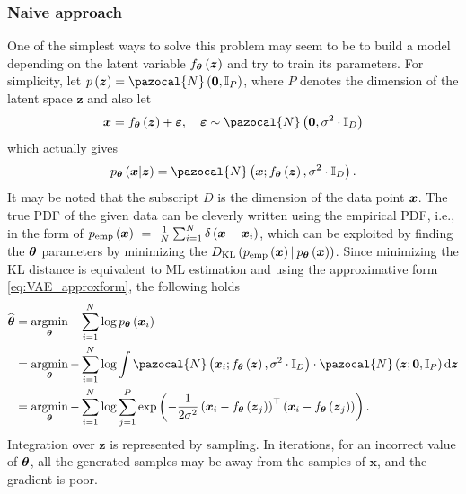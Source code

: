 \subsubsection{Naive approach}
One of the simplest ways to solve this problem may seem to be to build a model depending on the latent variable $f_{\boldsymbol{\theta}}\left(\boldsymbol{z}\right)$ and try to train its parameters. For simplicity, let $p\left(\boldsymbol{z} \right) = \pazocal{N}\left(\boldsymbol{0}, \mathbb{I}_P\right)$, where $P$ denotes the dimension of the latent space $\boldsymbol{z}$ and also let
\begin{equation}
\bx = f_{\bt}\left(\boldsymbol{z}\right) + \boldsymbol{\varepsilon}, \quad \boldsymbol{\varepsilon} \sim \pazocal{N}\left(\boldsymbol{0},\sigma^2\cdot\mathbb{I}_D \right)
\end{equation}
which actually gives 
\begin{equation}\label{eq:VAE_decoder}
p_{\bt}\left(\bx\vert\boldsymbol{z}\right) = \pazocal{N}\left(\boldsymbol{x};f_{\bt}\left(\boldsymbol{z}\right),\sigma^2\cdot\mathbb{I}_D \right).
\end{equation}
It may be noted that the subscript $D$ is the dimension of the data point $\boldsymbol{x}$. The true PDF of the given data can be cleverly written using the empirical PDF, i.e., in the form of $p_{\mathrm{emp}}\left(\boldsymbol{x} \right)~=~\frac{1}{N}\sum_{i=1}^N\delta\left(\boldsymbol{x} - \boldsymbol{x}_i\right) $,
which can be exploited by finding the $\boldsymbol{\theta}$ parameters by minimizing the $D_{\mathrm{KL}} \left(p_{\mathrm{emp}}\left(\boldsymbol{x} \right) \Vert p_{\boldsymbol{\theta}}\left(\boldsymbol{x}\right) \right)$. Since minimizing the KL distance is equivalent to ML estimation and using the approximative form \eqref{eq:VAE_approxform}, the following holds 
\begin{align}
    \widehat{\boldsymbol{\bt}} &= \argmin_{\boldsymbol{\bt}}- \sum_{i=1}^N\log p_{\boldsymbol{\bt}}\left(\boldsymbol{x}_i \right)\\
    &=  \argmin_{\boldsymbol{\bt}}- \sum_{i=1}^N \log \int \pazocal{N}\left(\boldsymbol{x}_i;f_{\bt}\left(\boldsymbol{z}\right),\sigma^2\cdot\mathbb{I}_D \right) \cdot \pazocal{N}\left(\boldsymbol{z};\boldsymbol{0}, \mathbb{I}_P\right) \d{\boldsymbol{z}}\\
    &= \argmin_{\boldsymbol{\bt}}- \sum_{i=1}^N \log \sum_{j=1}^{P}\exp\left(-\frac{1}{2\sigma^2}\left(\bx_i-f_{\bt}\left(\boldsymbol{z}_j\right)\right)^\top\left(\bx_i-f_{\bt}\left(\boldsymbol{z}_j\right)\right) \right).
\end{align}
Integration over $\boldsymbol{z}$ is represented by sampling. In iterations, for an incorrect value of $\boldsymbol{\theta}$, all the generated samples may
be away from the samples of $\boldsymbol{x}$, and the gradient is poor.


